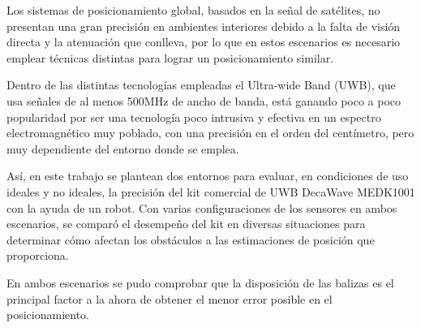 Los sistemas de posicionamiento global, basados en la señal de satélites, no presentan una gran precisión en ambientes interiores debido a la falta de visión directa y la atenuación que conlleva, por lo que en estos escenarios es necesario emplear técnicas distintas para lograr un posicionamiento similar.

Dentro de las distintas tecnologías empleadas el Ultra-wide Band (UWB), que usa señales de al menos 500MHz de ancho de banda, está ganando poco a poco popularidad por ser una tecnología poco intrusiva y efectiva en un espectro electromagnético muy poblado, con una precisión en el orden del centímetro, pero muy dependiente del entorno donde se emplea.

Así, en este trabajo se plantean dos entornos para evaluar, en condiciones de uso ideales y no ideales, la precisión del kit comercial de UWB DecaWave MEDK1001 con la ayuda de un robot.
Con varias configuraciones de los sensores en ambos escenarios, se comparó el desempeño del kit en diversas situaciones para determinar cómo afectan los obstáculos a las estimaciones de posición que proporciona.

En ambos escenarios se pudo comprobar que la disposición de las balizas es el principal factor a la ahora de obtener el menor error posible en el posicionamiento.
